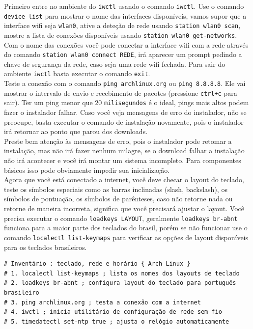 \documentclass[12pt,a4paper]{article}
\begin{document}
\vspace{\baselineskip}

Primeiro entre no ambiente do \texttt{iwctl} usando o comando \texttt{iwctl}. Use o comando \texttt{device list} para mostrar o nome das interfaces disponíveis, vamos supor que a interface wifi seja \texttt{wlan0}, ative a deteção de rede usando \texttt{station wlan0 scan}, mostre a lista de conexões disponíveis usando \texttt{station wlan0 get-networks}. Com o nome das conexões você pode conectar a interface wifi com a rede através do comando \texttt{station wlan0 connect REDE}, irá aparecer um prompt pedindo a chave de segurança da rede, caso seja uma rede wifi fechada. Para sair do ambiente \texttt{iwctl} basta executar o comando \texttt{exit}. \\

Teste a conexão com o comando \texttt{ping archlinux.org} ou \texttt{ping 8.8.8.8}. Ele vai mostrar o intervalo de envio e recebimento de pacotes (pressione \texttt{ctrl+c} para sair). Ter um ping menor que 20 \texttt{milisegundos} é o ideal, pings mais altos podem fazer o instalador falhar. Caso você veja mensagens de erro do instalador, não se preocupe, basta executar o comando de instalação novamente, pois o instalador irá retornar ao ponto que parou dos downloads. \\

Preste bem atenção às mensagens de erro, pois o instalador pode retomar a instalação, mas não irá fazer nenhum milagre, se o download falhar a instalação não irá acontecer e você irá montar um sistema incompleto. Para componentes básicos isso pode obviamente impedir sua inicialização. \\

Agora que você está conectado a internet, você deve checar o layout do teclado, teste os símbolos especiais como as barras inclinadas (slash, backslash), os símbolos de pontuação, os símbolos de parênteses, caso não retorne nada ou retorne de maneira incorreta, significa que você precisará ajustar o layout. Você precisa executar o comando \texttt{loadkeys LAYOUT}, geralmente \texttt{loadkeys br-abnt} funciona para a maior parte dos teclados do brasil, porém se não funcionar use o comando \texttt{localectl list-keymaps} para verificar as opções de layout disponíveis para os teclados brasileiros.\\

\begin{lstlisting}
# Inventário : teclado, rede e horário { Arch Linux }
# 1. localectl list-keymaps ; lista os nomes dos layouts de teclado
# 2. loadkeys br-abnt ; configura layout do teclado para português brasileiro
# 3. ping archlinux.org ; testa a conexão com a internet
# 4. iwctl ; inicia utilitário de configuração de rede sem fio
# 5. timedatectl set-ntp true ; ajusta o relógio automaticamente 
\end{lstlisting}
\end{document}
